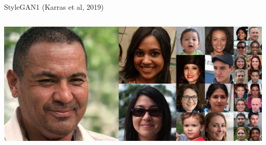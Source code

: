 \documentclass[8pt,xcolor=table,aspectratio=169]{beamer}
\begin{document}
\begin{frame}{StyleGAN1 (Karras et al, 2019)}
\begin{columns}
\begin{column}{0.5\textwidth}
\vspace{2em}

\includegraphics[width=\textwidth]{y5fwzHL.jpg}

\end{column}
\end{columns}

\end{frame}
\end{document}
